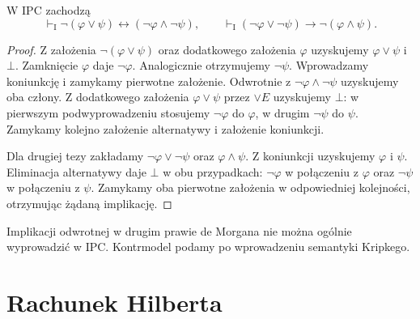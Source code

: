 \begin{stwierdzenie}
\label{prop:ncl-ipc-demorgan}
W IPC zachodzą
\[
 \vdash_{\mathrm I}\neg(\varphi\vee\psi)
       \leftrightarrow(\neg\varphi\wedge\neg\psi),
 \qquad
 \vdash_{\mathrm I}(\neg\varphi\vee\neg\psi)
       \to\neg(\varphi\wedge\psi).
\]
\end{stwierdzenie}
\begin{proof}
Z założenia $\neg(\varphi\vee\psi)$ oraz
dodatkowego założenia $\varphi$ uzyskujemy
$\varphi\vee\psi$ i $\bot$. Zamknięcie $\varphi$
daje $\neg\varphi$. Analogicznie otrzymujemy
$\neg\psi$. Wprowadzamy koniunkcję i zamykamy
pierwotne założenie.
Odwrotnie z $\neg\varphi\wedge\neg\psi$
uzyskujemy oba człony. Z dodatkowego założenia
$\varphi\vee\psi$ przez $\vee E$ uzyskujemy
$\bot$: w pierwszym podwyprowadzeniu stosujemy
$\neg\varphi$ do $\varphi$, w drugim
$\neg\psi$ do $\psi$. Zamykamy kolejno
założenie alternatywy i założenie koniunkcji.

Dla drugiej tezy zakładamy $\neg\varphi\vee\neg\psi$
oraz $\varphi\wedge\psi$. Z koniunkcji
uzyskujemy $\varphi$ i $\psi$.
Eliminacja alternatywy daje $\bot$ w obu przypadkach:
$\neg\varphi$ w połączeniu z $\varphi$ oraz
$\neg\psi$ w połączeniu z $\psi$.
Zamykamy oba pierwotne założenia w odpowiedniej
kolejności, otrzymując żądaną implikację.
\end{proof}
Implikacji odwrotnej w drugim prawie de Morgana
nie można ogólnie wyprowadzić w IPC. Kontrmodel
podamy po wprowadzeniu semantyki Kripkego.

\section{Rachunek Hilberta}

